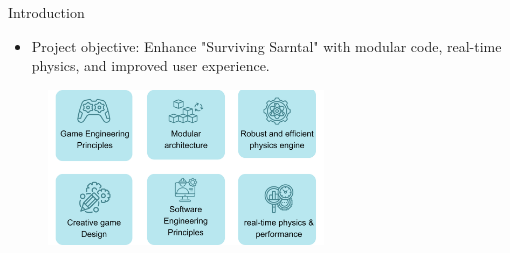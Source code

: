 \begin{frame}{Introduction}
    \begin{itemize}
        \item Project objective: Enhance "Surviving Sarntal" with modular code, real-time physics, and improved user experience.
    \end{itemize}
    \centering
    \begin{figure}
        \includegraphics[width=0.65\textwidth]{../figures/focusPoints.png}
    \end{figure}
\end{frame}